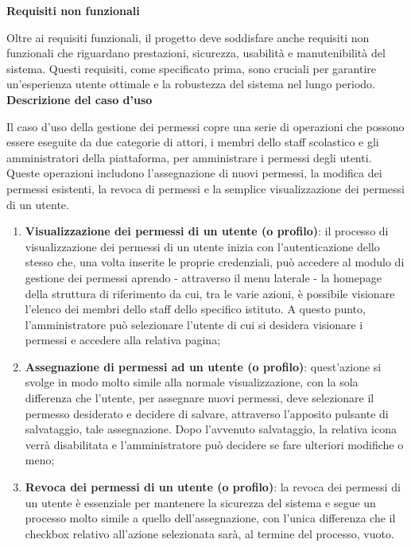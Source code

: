 \documentclass[a4paper, 12pt]{book}
\begin{document}
{\Large\textbf{Requisiti non funzionali}}

\smallskip

Oltre ai requisiti funzionali, il progetto deve soddisfare anche requisiti non funzionali che riguardano prestazioni, sicurezza, usabilità e
manutenibilità del sistema. Questi requisiti, come specificato prima, sono cruciali per garantire un'esperienza utente ottimale e la robustezza
del sistema nel lungo periodo.\\

\textbf{Descrizione del caso d'uso}

Il caso d'uso della gestione dei permessi copre una serie di operazioni che possono essere eseguite
da due categorie di attori, i membri dello staff scolastico e gli amministratori della piattaforma, per amministrare i
permessi degli utenti. Queste operazioni includono l'assegnazione di nuovi permessi,
la modifica dei permessi esistenti, la revoca di permessi e la semplice visualizzazione
dei permessi di un utente.\\

\begin{enumerate}
  \item \textbf{Visualizzazione dei permessi di un utente (o profilo)}: il processo di visualizzazione dei permessi di un
        utente inizia con l'autenticazione dello stesso che, una volta inserite le proprie credenziali, può accedere al
        modulo di gestione dei permessi aprendo - attraverso il menu laterale - la homepage della struttura di riferimento da
        cui, tra le varie azioni, è possibile visionare l'elenco dei membri dello staff dello specifico istituto. A questo
        punto, l'amministratore può selezionare l'utente di cui si desidera visionare i permessi e accedere alla
        relativa pagina;
  \item \textbf{Assegnazione di permessi ad un utente (o profilo)}: quest'azione si svolge in modo molto
        simile alla normale visualizzazione, con la sola differenza che l'utente, per assegnare nuovi permessi, deve selezionare
        il permesso desiderato e decidere di salvare, attraverso l'apposito pulsante di salvataggio, tale assegnazione. Dopo
        l'avvenuto salvataggio, la relativa icona verrà disabilitata e l'amministratore può decidere se fare ulteriori modifiche o meno;
  \item \textbf{Revoca dei permessi di un utente (o profilo)}: la revoca dei permessi di un utente è essenziale per mantenere la
        sicurezza del sistema e segue un processo molto simile a quello dell'assegnazione, con l'unica differenza
        che il checkbox relativo all'azione selezionata sarà, al termine del processo, vuoto.
\end{enumerate}
\end{document}
